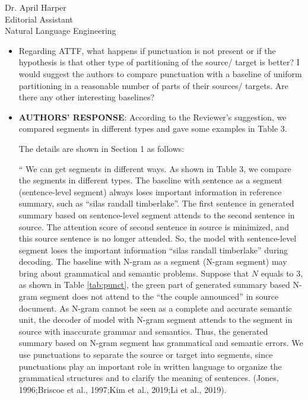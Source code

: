 \documentclass[11pt]{letter} %
\theoremstyle{definition}
\begin{document}
\begin{letter}{Dr. April Harper \\
            Editorial Assistant \\
			Natural Language Engineering}
\begin{enumerate}
\begin{itemize}
				\item Regarding ATTF, what happens if punctuation is not present or if the hypothesis is that other type of partitioning of the source/ target is better? I would suggest the authors to compare punctuation with a baseline of uniform partitioning in a reasonable number of parts of their sources/ targets. Are there any other interesting baselines?
				\item[] \textbf{AUTHORS' RESPONSE}: 
                According to the Reviewer's suggestion, we compared segments in different types and gave some examples in Table 3.

				The details are shown in Section 1 as follows:
				
				``
                We can get segments in different ways.
                As shown in Table 3, we compare the segments in different types.
                The baseline with sentence as a segment (sentence-level segment) 
                always loses important information in reference summary, such as ``silas randall timberlake''.
                The first sentence in generated summary based on sentence-level segment attends to 
                the second sentence in source. 
                The attention score of second sentence in source is minimized,
                and this source sentence is no longer attended. 
                So, the model with sentence-level segment loses the important information ``silas randall timberlake''
                during decoding.
                The baseline with N-gram as a segment (N-gram segment) may bring about grammatical and semantic problems.
                Suppose that $N$ equals to 3, as shown in Table \ref{tab:punct},
                the green part of generated summary based N-gram segment does not attend to the ``the couple announced''
                in source document. 
                As N-gram cannot be seen as a complete and accurate semantic unit,
                the decoder of model with N-gram segment attends to the segment in source with inaccurate grammar and semantics.
                Thus, the generated summary based on N-gram segment has grammatical and semantic errors.
                We use punctuations to separate the source or target into segments,
                since punctuations play an important role in written language to organize
                the grammatical structures and to clarify the meaning of sentences.
                (Jones, 1996;Briscoe et al., 1997;Kim et al., 2019;Li et al., 2019).

\end{itemize}
\end{enumerate}
\end{letter}
\end{document}
